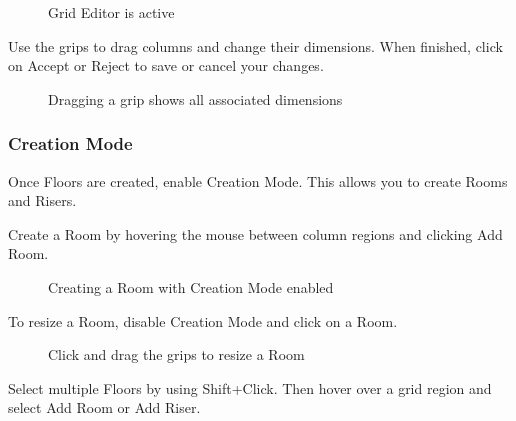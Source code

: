 \documentclass[letterpaper,10pt,english]{sphinxmanual}
\begin{document}
\begin{figure}[H]
\centering
\capstart

\noindent{}
\caption{Grid Editor is active}\label{\detokenize{docs/userguide/definingarchitecturalelements/floorplans/index-floor-plans:id6}}\end{figure}

Use the grips to drag columns and change their dimensions.  When finished, click on Accept or Reject to save or cancel your changes.

\begin{figure}[H]
\centering
\capstart

\noindent{}
\caption{Dragging a grip shows all associated dimensions}\label{\detokenize{docs/userguide/definingarchitecturalelements/floorplans/index-floor-plans:id7}}\end{figure}


\subsubsection{Creation Mode}
\label{\detokenize{docs/userguide/definingarchitecturalelements/floorplans/index-floor-plans:creation-mode}}
Once Floors are created, enable Creation Mode.  This allows you to create Rooms and Risers.

Create a Room by hovering the mouse between column regions and clicking Add Room.

\begin{figure}[H]
\centering
\capstart

\noindent{}
\caption{Creating a Room with Creation Mode enabled}\label{\detokenize{docs/userguide/definingarchitecturalelements/floorplans/index-floor-plans:id8}}\end{figure}

To resize a Room, disable Creation Mode and click on a Room.

\begin{figure}[H]
\centering
\capstart

\noindent{}
\caption{Click and drag the grips to resize a Room}\label{\detokenize{docs/userguide/definingarchitecturalelements/floorplans/index-floor-plans:id9}}\end{figure}

Select multiple Floors by using Shift+Click.  Then hover over a grid region and select Add Room or Add Riser.
\end{document}

